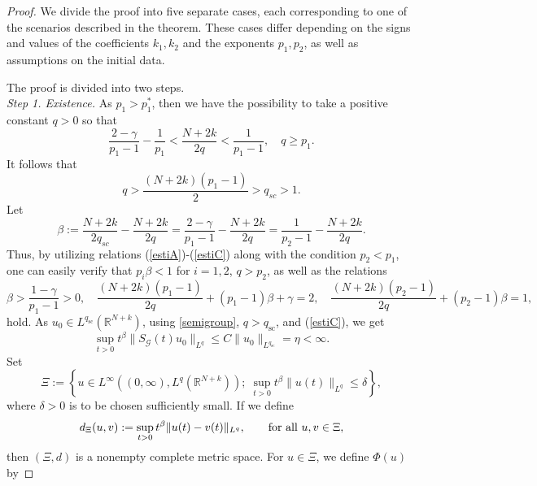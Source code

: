 \documentclass[a4,psfig,english,12pt,epsf,portrait]{article}
\numberwithin{equation}{section}
\def\R{{\mathbb {R}}}
\def\R{\mathbb{R}}
\begin{document}
\begin{proof} We divide the proof into five separate cases, each corresponding to one of the scenarios described in the theorem. These cases differ depending on the signs and values of the coefficients $k_1,k_2$ and the exponents $p_1,p_2$, as well as assumptions on the initial data.
	
	
	 The proof is divided into two steps.\\
	{\it Step 1. Existence.} As $p_1>p_1^*$, then we have the possibility to
	take a positive constant $q>0$ so that
	\begin{equation}\label{estiA}
		\frac{2-\gamma}{p_1-1}-\frac{1}{p_1}<\frac{N+2k}{2
			q}<\frac{1}{p_1-1},\quad q\geq p_1.
	\end{equation}
	It follows that
	\begin{equation}\label{estiB}
		q>\frac{(N+2k)(p_1-1)}{2}>q_{sc}>1.
	\end{equation}
	Let
	\begin{equation}\label{estiC}
		\beta:=\frac{N+2k}{2 q_{sc}}-\frac{N+2k}{2
			q}=\frac{2-\gamma}{p_1-1}-\frac{N+2k}{2
			q}=\frac{1}{p_2-1}-\frac{N+2k}{2
			q}.
	\end{equation}
	Thus, by utilizing relations (\ref{estiA})-(\ref{estiC}) along with the condition $p_2<p_1$, one can easily verify that $p_i\beta<1$ for $i=1,2$, $q> p_2$, as well as the relations
	\begin{equation}\label{estiD}
		\beta>\frac{1-\gamma}{p_1-1}>0,\quad \frac{(N+2k)(p_1-1)}{2
			q}+(p_1-1)\beta+\gamma=2,\quad \frac{(N+2k)(p_2-1)}{2
			q}+(p_2-1)\beta=1,
	\end{equation}
	hold. As $u_0\in L^{q_{\mathrm{sc}}}(\R^{N+k})$, using \eqref{semigroup}, $q>q_{\mathrm{sc}}$, and (\ref{estiC}), we
	get
	\begin{equation}\label{estiE}
		\sup_{t>0}t^\beta\|S_{\mathcal{G}}(t)u_0\|_{L^q}\leq
		C \|u_0\|_{L^{q_{\mathrm{sc}}}}=\eta<\infty.
	\end{equation}
	Set
	\begin{equation}\label{estiF}
		\Xi:=\left\{u\in
		L^\infty((0,\infty),L^q(\mathbb{R}^{N+k}));\;\sup_{t>0}t^\beta\|u(t)\|_{L^q}\leq\delta\right\},
	\end{equation}
	where $\delta>0$ is to be chosen sufficiently small. If we define
	\begin{equation}\label{estiG}
		d_{\Xi}(u,v):=\sup_{t>0}t^\beta\|u(t)-v(t)\|_{L^q},\qquad \hbox{for all}\,\, u,v\in\Xi,
	\end{equation}
	then $(\Xi,d)$ is a nonempty complete metric space. For $u\in\Xi$, we define $\Phi(u)$ by

\end{proof}
\end{document}
